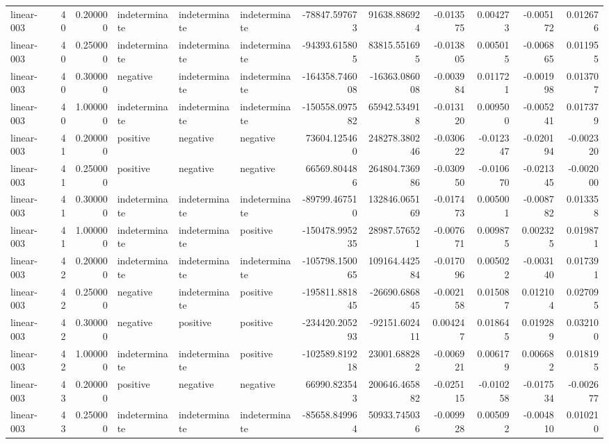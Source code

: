 \begin{tabular}{lrrlllrrrrrr}
linear-003 & 40 & 0.200000 & indeterminate & indeterminate & indeterminate & -78847.597673 & 91638.886924 & -0.013575 & 0.004273 & -0.005172 & 0.012676 \\
linear-003 & 40 & 0.250000 & indeterminate & indeterminate & indeterminate & -94393.615805 & 83815.551695 & -0.013805 & 0.005015 & -0.006865 & 0.011955 \\
linear-003 & 40 & 0.300000 & negative & indeterminate & indeterminate & -164358.746008 & -16363.086008 & -0.003984 & 0.011721 & -0.001998 & 0.013707 \\
linear-003 & 40 & 1.000000 & indeterminate & indeterminate & indeterminate & -150558.097582 & 65942.534918 & -0.013120 & 0.009500 & -0.005241 & 0.017379 \\
linear-003 & 41 & 0.200000 & positive & negative & negative & 73604.125460 & 248278.380246 & -0.030622 & -0.012347 & -0.020194 & -0.002320 \\
linear-003 & 41 & 0.250000 & positive & negative & negative & 66569.804486 & 264804.736986 & -0.030950 & -0.010670 & -0.021345 & -0.002000 \\
linear-003 & 41 & 0.300000 & indeterminate & indeterminate & indeterminate & -89799.467510 & 132846.065169 & -0.017473 & 0.005001 & -0.008782 & 0.013358 \\
linear-003 & 41 & 1.000000 & indeterminate & indeterminate & positive & -150478.995235 & 28987.576521 & -0.007671 & 0.009875 & 0.002325 & 0.019871 \\
linear-003 & 42 & 0.200000 & indeterminate & indeterminate & indeterminate & -105798.150065 & 109164.442584 & -0.017096 & 0.005022 & -0.003140 & 0.017391 \\
linear-003 & 42 & 0.250000 & negative & indeterminate & positive & -195811.881845 & -26690.686845 & -0.002158 & 0.015087 & 0.012104 & 0.027095 \\
linear-003 & 42 & 0.300000 & negative & positive & positive & -234420.205293 & -92151.602411 & 0.004247 & 0.018645 & 0.019289 & 0.032100 \\
linear-003 & 42 & 1.000000 & indeterminate & indeterminate & positive & -102589.819218 & 23001.688282 & -0.006921 & 0.006179 & 0.006682 & 0.018195 \\
linear-003 & 43 & 0.200000 & positive & negative & negative & 66990.823543 & 200646.465882 & -0.025115 & -0.010258 & -0.017534 & -0.002677 \\
linear-003 & 43 & 0.250000 & indeterminate & indeterminate & indeterminate & -85658.849964 & 50933.745036 & -0.009928 & 0.005092 & -0.004810 & 0.010210 \\

\end{tabular}
